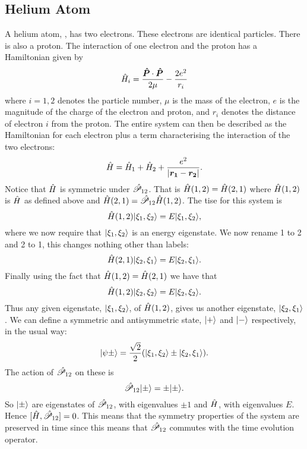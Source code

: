 \subsection{Helium Atom}
A helium atom, , has two electrons.
These electrons are identical particles.
There is also a proton.
The interaction of one electron and the proton has a Hamiltonian given by
\[\hat{H}_i = \frac{\bm{\hat{P}}\cdot\bm{\hat{P}}}{2\mu} - \frac{2e^2}{r_i}\]
where \(i = 1, 2\) denotes the particle number, \(\mu\) is the mass of the electron, \(e\) is the magnitude of the charge of the electron and proton, and \(r_i\) denotes the distance of electron \(i\) from the proton.
The entire system can then be described as the Hamiltonian for each electron plus a term characterising the interaction of the two electrons:
\[\hat{H} = \hat{H}_1 + \hat{H}_2 + \frac{e^2}{\abs{\bm{r_1} - \bm{r_2}}}.\]
Notice that \(\hat{H}\) is symmetric under \(\hat{\mathscr{P}}_{12}\).
That is \(\hat{H}(1, 2) = \hat{H}(2, 1)\) where \(\hat{H}(1, 2)\) is \(\hat{H}\) as defined above and \(\hat{H}(2, 1) = \hat{\mathscr{P}}_{12}\hat{H}(1, 2)\).
The \gls{tise} for this system is
\[\hat{H}(1, 2)\vert {\xi_1, \xi_2} \rangle = E\vert {\xi_1, \xi_2} \rangle,\]
where we now require that \(\vert {\xi_1, \xi_2} \rangle\) is an energy eigenstate.
We now rename 1 to 2 and 2 to 1, this changes nothing other than labels:
\[\hat{H}(2, 1)\vert {\xi_2, \xi_1} \rangle = E\vert {\xi_2, \xi_1} \rangle.\]
Finally using the fact that \(\hat{H}(1, 2) = \hat{H}(2, 1)\) we have that
\[\hat{H}(1, 2)\vert {\xi_2, \xi_2} \rangle = E\vert {\xi_2, \xi_2} \rangle.\]
Thus any given eigenstate, \(\vert {\xi_1, \xi_2} \rangle\), of \(\hat{H}(1, 2)\), gives us another eigenstate, \(\vert {\xi_2, \xi_1} \rangle\).
We can define a symmetric and antisymmetric state, \(\vert {+} \rangle\) and \(\vert {-} \rangle\) respectively, in the usual way:
\[\vert {\psi\pm} \rangle = \frac{\sqrt{2}}{2}(\vert {\xi_1, \xi_2} \rangle \pm \vert {\xi_2, \xi_1} \rangle).\]
The action of \(\hat{\mathscr{P}}_{12}\) on these is
\[\hat{\mathscr{P}}_{12}\vert {\pm} \rangle = \pm\vert {\pm} \rangle.\]
So \(\vert {\pm} \rangle\) are eigenstates of \(\hat{\mathscr{P}}_{12}\), with eigenvalues \(\pm 1\) and \(\hat{H}\), with eigenvalues \(E\).
Hence \([\hat{H}, \hat{\mathscr{P}}_{12}] = 0\).
This means that the symmetry properties of the system are preserved in time since this means that \(\hat{\mathscr{P}}_{12}\) commutes with the time evolution operator.

